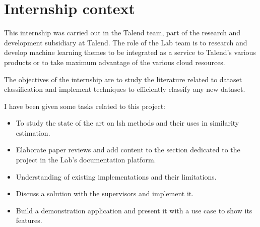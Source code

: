 \section*{Internship context}
This internship was carried out in the Talend team, part of the research and
development subsidiary at Talend. The role of the Lab team is to research and
develop machine learning themes to be integrated as a service to Talend's
various products or to take maximum advantage of the various cloud resources.

The objectives of the internship are to study the literature related to dataset
classification and implement techniques to efficiently classify any new dataset. 

I have been given some tasks related to this project:

\begin{itemize}
    \item To study the state of the art on \acrfull{lsh} methods and their uses
    in similarity estimation.
    \item Elaborate paper reviews and add content to the section dedicated to
    the project in the Lab's documentation platform.
    \item Understanding of existing implementations and their limitations.
    \item Discuss a solution with the supervisors and implement it.
    \item Build a demonstration application and present it with a use case to
    show its features.
\end{itemize}
